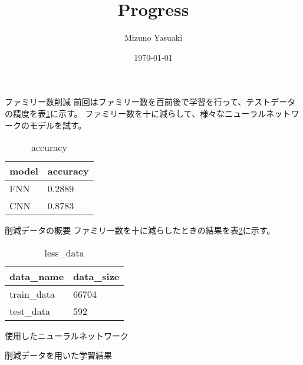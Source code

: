 \documentclass[dvipdfmx]{beamer}
\title{Progress}
\date{\today}
\author{Mizuno Yasuaki}
\begin{document}
  \maketitle
  
  \begin{frame}{ファミリー数削減}
    前回はファミリー数を百前後で学習を行って、テストデータの精度を表\ref{tab:accuracy}に示す。
    ファミリー数を十に減らして、様々なニューラルネットワークのモデルを試す。
    \begin{table}
      \caption{accuracy}
      \label{tab:accuracy}
      \centering
      \begin{tabular}{ll}
        \hline
        model & accuracy \\
        \hline \hline
        FNN & 0.2889 \\
        CNN & 0.8783 \\
        \hline
      \end{tabular}
    \end{table}
  \end{frame}

  \begin{frame}{削減データの概要}
    ファミリー数を十に減らしたときの結果を表\ref{tab:less_data}に示す。

    \begin{table}
      \caption{less\_data}
      \label{tab:less_data}
      \centering
      \begin{tabular}{ll}
        \hline
        data\_name & data\_size \\
        \hline \hline
        train\_data & 66704 \\
        test\_data & 592 \\
        \hline
      \end{tabular}
    \end{table}
  \end{frame}

  \begin{frame}{使用したニューラルネットワーク}

  \end{frame}

  \begin{frame}{削減データを用いた学習結果}
    \begin{table}
      
    \end{table}
  \end{frame}
\end{document}

